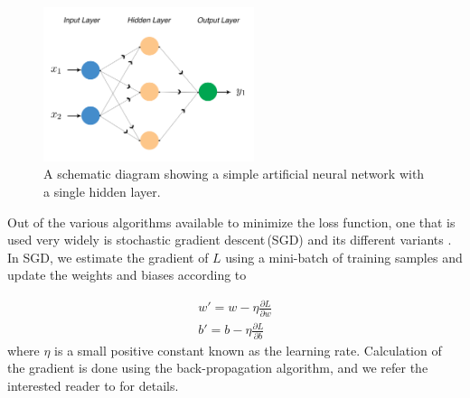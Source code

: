 \begin{figure}[htbp]
	\begin{center}
		\includegraphics[width=0.55\textwidth]{schematic_toy_network.pdf}
	\end{center}
	\caption{A schematic diagram showing a simple artificial neural network with a single hidden layer.}
	\label{fig:schematic_network}
\end{figure}

Out of the various algorithms available to minimize the loss function, one that is used very widely is stochastic gradient descent\,(SGD) and its different variants \citep{nielsen}. In SGD, we estimate the gradient of $L$ using a mini-batch of training samples and update the weights and biases according to

\begin{equation}
\begin{aligned}
w' = w -\eta \frac{\partial L}{\partial w} \\
b' = b - \eta \frac{\partial L}{\partial b}
\end{aligned}
\label{eq:sgd}
\end{equation}
where $\eta$ is a small positive constant known as the learning rate. Calculation of the gradient is done using the back-propagation algorithm, and we refer the interested reader to \citet{rumelhart_88} for details.


